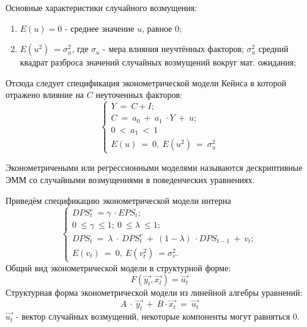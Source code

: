 \documentclass[12pt,a4paper]{article}
\begin{document}
	Основные характеристики случайного возмущения:
\begin{enumerate}
\item $\displaystyle E( u) =0$ - среднее значение $\displaystyle u$, равное 0;
\item $\displaystyle E\left( u^{2}\right) \ =\sigma ^{2}_{u}$, где $\displaystyle \sigma _{u}$ - мера влияния неучтённых факторов; $\displaystyle \sigma ^{2}_{u}$ средний квадрат разброса значений случайных возмущений вокруг мат. ожидания;
\end{enumerate}

	Отсюда следует спецификация эконометрической модели Кейнса в которой отражено влияние на $\displaystyle C$ неуточенных факторов:
\begin{equation}
\begin{cases}
Y\ =\ C+I;\\
C\ =\ a_{0} \ +\ a_{1} \ \cdot Y\ +\ u;\\
0\ < \ a_{1} \ < \ 1\\
E( u) \ =\ 0,\ E\left( u^{2}\right) \ =\ \sigma ^{2}_{u}
\end{cases}
\end{equation}

Эконометричеными или регрессионными моделями называются дескриптивные ЭММ со случайными возмущениями в поведенческих уравнениях.

	Приведём спецификацию эконометрической модели интерна
\begin{equation}
\begin{cases}
DPS^{e}_{t} \ =\gamma \ \cdot EPS_{t} ;\\
0\ \leq \gamma \ \leq 1;\ 0\ \leq \lambda \ \leq 1;\\
DPS_{t} \ =\ \lambda \ \cdot \ DPS^{e}_{t} \ +\ ( 1-\lambda ) \ \cdot DPS_{t-1} \ +\ v_{t} ;\\
E( v_{t}) \ =\ 0,\ E\left( v^{2}_{t}\right) \ =\sigma ^{2}_{v} .\ 
\end{cases}
\end{equation}
Общий вид эконометрической модели в структурной форме:
\begin{equation}
F\left(\overrightarrow{y_{t}} ,\overrightarrow{x_{t}}\right) =\overrightarrow{u_{t}}
\end{equation}
Структурная форма эконометрической модели из линейной алгебры уравнений:
\begin{equation}
A\ \cdotp \ \overrightarrow{y_{t}} \ +\ B\cdotp \overrightarrow{x_{t}} \ =\ \overrightarrow{u_{t}}
\end{equation}
$\displaystyle \overrightarrow{u_{t}}$ - вектор случайных возмущений, некоторые компоненты могут равняться 0.
\end{document}
